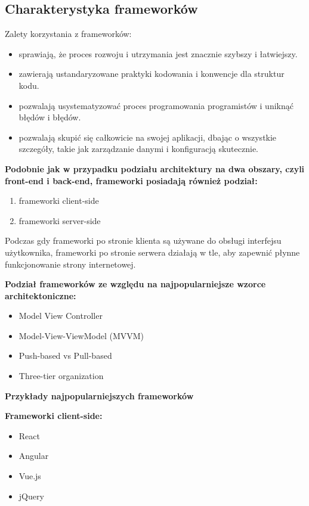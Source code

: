 \subsection{Charakterystyka frameworków}

Zalety korzystania z frameworków:
\begin{itemize}
\item sprawiają, że proces rozwoju i utrzymania jest znacznie szybszy i łatwiejszy.
\item zawierają ustandaryzowane praktyki kodowania i konwencje dla struktur kodu.
\item pozwalają usystematyzować proces programowania programistów i uniknąć błędów i błędów.
\item pozwalają skupić się całkowicie na swojej aplikacji, dbając o wszystkie szczegóły, takie jak zarządzanie danymi i konfiguracją skutecznie.
\end{itemize}

\textbf{Podobnie jak w przypadku podziału architektury na dwa obszary, czyli front-end i back-end, frameworki posiadają również podział:}
\begin{enumerate}
    \item frameworki client-side
    \item frameworki server-side
\end{enumerate}

Podczas gdy frameworki po stronie klienta są używane do obsługi interfejsu użytkownika, frameworki po stronie serwera działają w tle, aby zapewnić płynne funkcjonowanie strony internetowej.

\textbf{Podział frameworków ze względu na najpopularniejsze wzorce architektoniczne:}
\begin{itemize}
\item Model View Controller
\item Model-View-ViewModel (MVVM)
\item Push-based vs Pull-based
\item Three-tier organization
\end{itemize}

\textbf{Przykłady najpopularniejszych frameworków}

\textbf{Frameworki client-side:}
\begin{itemize}
\item React
\item Angular
\item Vue.js
\item jQuery
\end{itemize}

